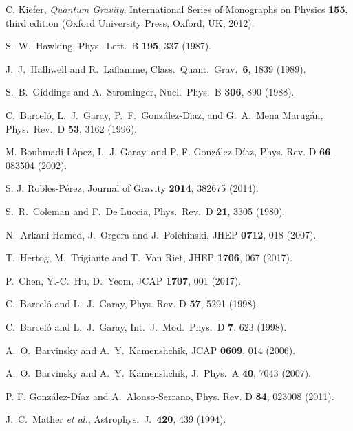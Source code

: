 \documentclass[aps,nofootinbib,prd,superscriptaddress,eqsecnum,showpacs,showkeys,preprintnumbers,altaffilletter]{revtex4}
\begin{document}


\begin{thebibliography}{99}

C. Kiefer, {\textit {Quantum Gravity}}, International Series of Monographs on Physics {\bf 155}, third edition (Oxford University Press, Oxford, UK, 2012).

  S.~W.~Hawking,
  Phys.\ Lett.\ B {\bf 195}, 337 (1987).

  J.~J.~Halliwell and R.~Laflamme,
  Class.\ Quant.\ Grav.\  {\bf 6}, 1839 (1989).

  S.~B.~Giddings and A.~Strominger,
  Nucl.\ Phys.\ B {\bf 306}, 890 (1988).

  C.~Barcel\'o, L.~J.~Garay, P.~F.~Gonz\'alez-D\'{\i}az, and G.~A.~Mena Marug\'an,
  Phys.\ Rev.\ D {\bf 53}, 3162 (1996).
  
M. Bouhmadi-L\'opez, L. J. Garay, and P. F. Gonz\'alez-D\'iaz, 
Phys. Rev. D {\bf 66}, 083504 (2002).

S. J. Robles-P{\'e}rez, 
Journal of Gravity \textbf{2014}, 382675 (2014).
  
  S.~R.~Coleman and F.~De Luccia,
  Phys.\ Rev.\ D {\bf 21}, 3305 (1980).

  N.~Arkani-Hamed, J.~Orgera and J.~Polchinski,
  JHEP {\bf 0712}, 018 (2007).
  
  T.~Hertog, M.~Trigiante and T.~Van Riet,
  JHEP {\bf 1706}, 067 (2017).
  
P.~Chen, Y.-C.~Hu, D.~Yeom,
JCAP {\bf 1707}, 001 (2017).

C.~Barcel\'o and L.~J.~Garay, 
Phys. Rev. D {\bf 57}, 5291 (1998).

C.~Barcel\'o and L.~J.~Garay,
Int.~J.~Mod.~Phys.~D {\bf 7}, 623 (1998).

A.~O.~Barvinsky and A.~Y.~Kamenshchik,
JCAP {\bf 0609}, 014 (2006).

A.~O.~Barvinsky and A.~Y.~Kamenshchik,
 J.~Phys.~A {\bf 40}, 7043 (2007).
  
  P. F. Gonz\'alez-D\'iaz and A.~Alonso-Serrano,
  Phys. Rev. D {\bf 84}, 023008 (2011).
  
  J.~C.~Mather {\it et al.},
  Astrophys.\ J.\  {\bf 420}, 439 (1994).
  

\end{thebibliography}
\end{document}
